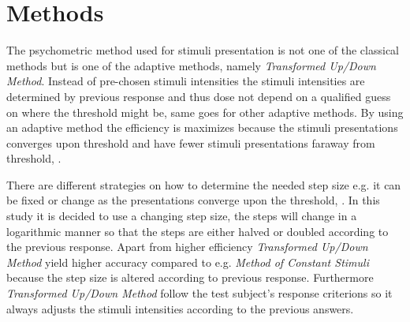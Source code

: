 \section*{Methods}
\label{Methods}
%
The psychometric method used for stimuli presentation is not one of the classical methods but is one of the adaptive methods, namely \textit{Transformed Up/Down Method}. Instead of pre-chosen stimuli intensities the stimuli intensities are determined by previous response and thus dose not depend on a qualified guess on where the threshold might be, same goes for other adaptive methods. By using an adaptive method the efficiency is maximizes because the stimuli presentations converges upon threshold and have fewer stimuli presentations faraway from threshold, \parencite[p. 287]{PDF:Hearing}.

There are different strategies on how to determine the needed step size e.g. it can be fixed or change as the presentations converge upon the threshold, \parencite[p. 22]{PDF:Psychoacoustic}. In this study it is decided to use a changing step size, the steps will change in a logarithmic manner so that the steps are either halved or doubled according to the previous response. Apart from higher efficiency \textit{Transformed Up/Down Method} yield higher accuracy compared to e.g. \textit{Method of Constant Stimuli} because the step size is altered according to previous response. Furthermore \textit{Transformed Up/Down Method} follow the test subject's response criterions so it always adjusts the stimuli intensities according to the previous answers.  

